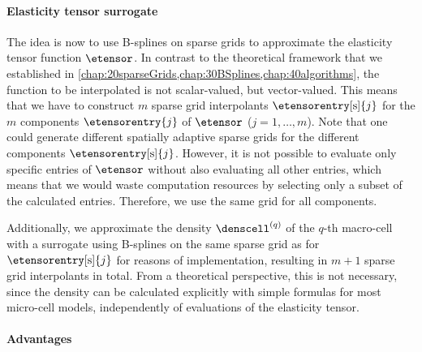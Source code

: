 \paragraph{Elasticity tensor surrogate}

The idea is now to use B-splines on sparse grids to approximate
the elasticity tensor function $\etensor$.
In contrast to the theoretical framework that we established in
\cref{chap:20sparseGrids,chap:30BSplines,chap:40algorithms},
the function to be interpolated is not scalar-valued, but vector-valued.
This means that we have to construct $m$ sparse grid interpolants
$\etensorentry[\sparse]{j}$
for the $m$ components $\etensorentry{j}$ of $\etensor$ ($j = 1, \dotsc, m$).
Note that one could generate different spatially adaptive sparse grids for the
different components $\etensorentry[\sparse]{j}$.
However, it is not possible to evaluate only specific entries of $\etensor$
without also evaluating all other entries,
which means that we would waste computation resources by selecting only
a subset of the calculated entries.
Therefore, we use the same grid for all components.

Additionally, we approximate the density $\denscell^{(q)}$
of the $q$-th macro-cell with a surrogate using
B-splines on the same sparse grid as for $\etensorentry[\sparse]{j}$
for reasons of implementation,
resulting in $m + 1$ sparse grid interpolants in total.
From a theoretical perspective, this is not necessary,
since the density can be calculated explicitly with simple formulas
for most micro-cell models, independently of evaluations of the
elasticity tensor.

\paragraph{Advantages}


